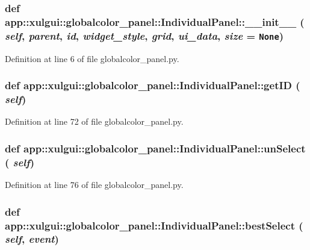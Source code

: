 \subsubsection{\setlength{\rightskip}{0pt plus 5cm}def app::xulgui::globalcolor\_\-panel::IndividualPanel::\_\-\_\-init\_\-\_\- ( {\em self},  {\em parent},  {\em id},  {\em widget\_\-style},  {\em grid},  {\em ui\_\-data},  {\em size} = {\tt None})}\label{classapp_1_1xulgui_1_1globalcolor__panel_1_1IndividualPanel_acd852011efdbf7e0dfd4977ee24dff9}




Definition at line 6 of file globalcolor\_\-panel.py.
\subsubsection{\setlength{\rightskip}{0pt plus 5cm}def app::xulgui::globalcolor\_\-panel::IndividualPanel::getID ( {\em self})}\label{classapp_1_1xulgui_1_1globalcolor__panel_1_1IndividualPanel_745425a97c48428c6e27ae2bf4fb04b2}




Definition at line 72 of file globalcolor\_\-panel.py.
\subsubsection{\setlength{\rightskip}{0pt plus 5cm}def app::xulgui::globalcolor\_\-panel::IndividualPanel::unSelect ( {\em self})}\label{classapp_1_1xulgui_1_1globalcolor__panel_1_1IndividualPanel_b06b878523951f8430b5edb354fa16fd}




Definition at line 76 of file globalcolor\_\-panel.py.
\subsubsection{\setlength{\rightskip}{0pt plus 5cm}def app::xulgui::globalcolor\_\-panel::IndividualPanel::bestSelect ( {\em self},  {\em event})}\label{classapp_1_1xulgui_1_1globalcolor__panel_1_1IndividualPanel_f622db3c4cd4e6a61620cf7a4dc272f0}




